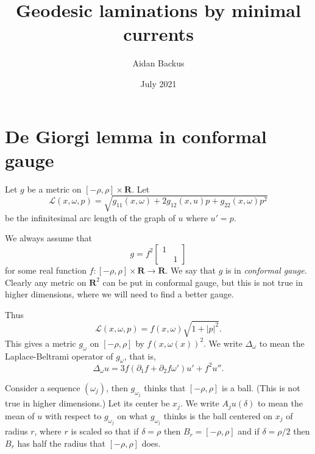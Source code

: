 \documentclass[reqno,12pt,letterpaper]{amsart}
\title[Geodesic laminations by minimal currents]{Geodesic laminations by minimal currents}
\author{Aidan Backus}
\date{July 2021}
\newcommand{\RR}{\mathbf{R}}
\newcommand{\dfn}[1]{\emph{#1}\index{#1}}
\theoremstyle{definition}
\numberwithin{equation}{section}
\begin{document}


\section{De Giorgi lemma in conformal gauge}
Let $g$ be a metric on $[-\rho, \rho] \times \RR$.
Let
$$\mathscr L(x, \omega, p) = \sqrt{g_{11}(x, \omega) + 2g_{12}(x, u)p + g_{22}(x, \omega) p^2}$$
be the infinitesimal arc length of the graph of $u$ where $u' = p$.

We always assume that
$$g = f^2 \begin{bmatrix}1 & \\ & 1\end{bmatrix}$$
for some real function $f: [-\rho, \rho] \times \RR \to \RR$.
We say that $g$ is in \dfn{conformal gauge}.
Clearly any metric on $\RR^2$ can be put in conformal gauge, but this is not true in higher dimensions, where we will need to find a better gauge.

Thus
$$\mathscr L(x, \omega, p) = f(x, \omega)\sqrt{1 + |p|^2}.$$
This gives a metric $g_\omega$ on $[-\rho, \rho]$ by $f(x, \omega(x))^2$.
We write $\Delta_\omega$ to mean the Laplace-Beltrami operator of $g_\omega$, that is,
$$\Delta_\omega u = 3f(\partial_1f + \partial_2f \omega')u' + f^2 u''.$$

Consider a sequence $(\omega_j)$, then $g_{\omega_j}$ thinks that $[-\rho, \rho]$ is a ball.
(This is not true in higher dimensions.)
Let its center be $x_j$.
We write $A_ju(\delta)$ to mean the mean of $u$ with respect to $g_{\omega_j}$ on what $g_{\omega_j}$ thinks is the ball centered on $x_j$ of radius $r$, where $r$ is scaled so that if $\delta = \rho$ then $B_r = [-\rho, \rho]$ and if $\delta = \rho/2$ then $B_r$ has half the radius that $[-\rho, \rho]$ does.
\end{document}
